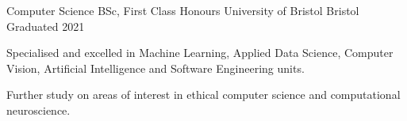 \vspace{-0.1cm}

\begin{cventries}

  \cventry
    {Computer Science BSc, First Class Honours} %
    {University of Bristol} %
    {Bristol} %
    {Graduated 2021} %
    {
      \begin{cvitems} %
        \item {Specialised and excelled in Machine Learning, Applied Data Science, Computer Vision, Artificial Intelligence and Software Engineering units.}
        \item{Further study on areas of interest in ethical computer science and computational neuroscience.}
      \end{cvitems}
    }
    
    


\end{cventries}
